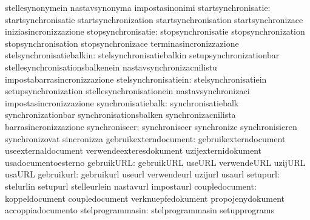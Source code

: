                                   stellesynonymein                 nastavsynonyma
                                  impostasinonimi
             startsynchronisatie: startsynchronisatie              startsynchronization
                                  startsynchronisation             startsynchronizace
                                  iniziasincronizzazione
              stopsynchronisatie: stopsynchronisatie               stopsynchronization
                                  stopsynchronisation              stopsynchronizace
                                  terminasincronizzazione
        stelsynchronisatiebalkin: stelsynchronisatiebalkin         setupsynchronizationbar
                                  stellesynchronisationsbalkenein  nastavsynchronizacnilistu
                                  impostabarrasincronizzazione
            stelsynchronisatiein: stelsynchronisatiein             setupsynchronization
                                  stellesynchronisationein         nastavsynchronizaci
                                  impostasincronizzazione
              synchronisatiebalk: synchronisatiebalk               synchronizationbar
                                  synchronisationsbalken           synchronizacnilista
                                  barrasincronizzazione
                   synchroniseer: synchroniseer                    synchronize
                                  synchronisieren                  synchronizovat
                                  sincronizza
           gebruikexterndocument: gebruikexterndocument            useexternaldocument
                                  verwendeexteresdokument          uzijexternidokument
                                  usadocumentoesterno
                      gebruikURL: gebruikURL                       useURL
                                  verwendeURL                      uzijURL
                                  usaURL
                      gebruikurl: gebruikurl                       useurl
                                  verwendeurl                      uzijurl
                                  usaurl
                        setupurl: stelurlin                        setupurl
                                  stelleurlein                     nastavurl
                                  impostaurl
                  coupledocument: koppeldocument                   coupledocument
                                  verknuepfedokument               propojenydokument
                                  accoppiadocumento
                stelprogrammasin: stelprogrammasin                 setupprograms
